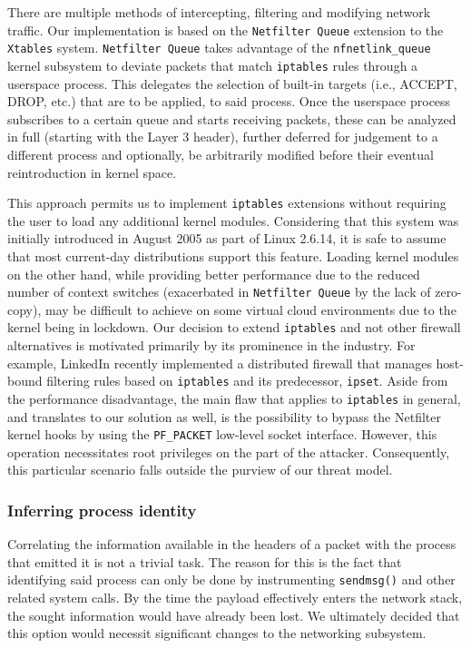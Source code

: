 There are multiple methods of intercepting, filtering and modifying network traffic. Our implementation is based on the \texttt{Netfilter Queue} extension to the \texttt{Xtables} system. \texttt{Netfilter Queue} takes advantage of the \texttt{nfnetlink\_queue} kernel subsystem to deviate packets that match \texttt{iptables} rules through a userspace process. This delegates the selection of built-in targets (i.e., ACCEPT, DROP, etc.) that are to be applied, to said process. Once the userspace process subscribes to a certain queue and starts receiving packets, these can be analyzed in full (starting with the Layer 3 header), further deferred for judgement to a different process and optionally, be arbitrarily modified before their eventual reintroduction in kernel space.

This approach permits us to implement \texttt{iptables} extensions without requiring the user to load any additional kernel modules. Considering that this system was initially introduced in August 2005 as part of Linux 2.6.14, it is safe to assume that most current-day distributions support this feature. Loading kernel modules on the other hand, while providing better performance due to the reduced number of context switches (exacerbated in \texttt{Netfilter Queue} by the lack of zero-copy), may be difficult to achieve on some virtual cloud environments due to the kernel being in lockdown. Our decision to extend \texttt{iptables} and not other firewall alternatives is motivated primarily by its prominence in the industry. For example, LinkedIn recently implemented a distributed firewall \cite{linkedin_dfw} that manages host-bound filtering rules based on \texttt{iptables} and its predecessor, \texttt{ipset}. Aside from the performance disadvantage, the main flaw that applies to \texttt{iptables} in general, and translates to our solution as well, is the possibility to bypass the Netfilter kernel hooks by using the \texttt{PF\_PACKET} low-level socket interface. However, this operation necessitates root privileges on the part of the attacker. Consequently, this particular scenario falls outside the purview of our threat model.


\subsubsection{Inferring process identity}

Correlating the information available in the headers of a packet with the process that emitted it is not a trivial task. The reason for this is the fact that identifying said process can only be done by instrumenting \texttt{sendmsg()} and other related system calls. By the time the payload effectively enters the network stack, the sought information would have already been lost. We ultimately decided that this option would necessit significant changes to the networking subsystem.

